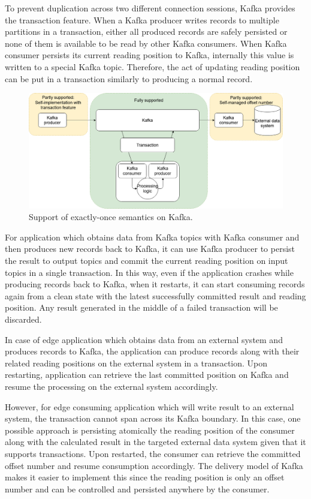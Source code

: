 To prevent duplication across two different connection sessions, Kafka provides the transaction feature. When a Kafka producer writes records to multiple partitions in a transaction, either all produced records are safely persisted or none of them is available to be read by other Kafka consumers. When Kafka consumer persists its current reading position to Kafka, internally this value is written to a special Kafka topic. Therefore, the act of updating reading position can be put in a transaction similarly to producing a normal record.

\begin{figure}[h]
	\centering
	\includegraphics[width=\linewidth]{images/exactly-once-kafka.png}
	\caption{Support of exactly-once semantics on Kafka.}
	\label{fig:exactlyoncekafka}
\end{figure}


For application which obtains data from Kafka topics with Kafka consumer and then produces new records back to Kafka, it can use Kafka producer to persist the result to output topics and commit the current reading position on input topics in a single transaction. In this way, even if the application crashes while producing records back to Kafka, when it restarts, it can start consuming records again from a clean state with the latest successfully committed result and reading position. Any result generated in the middle of a failed transaction will be discarded. 

In case of edge application which obtains data from an external system and produces records to Kafka, the application can produce records along with their related reading positions on the external system in a transaction. Upon restarting, application can retrieve the last committed position on Kafka and resume the processing on the external system accordingly. 

However, for edge consuming application which will write result to an external system, the transaction cannot span across its Kafka boundary. In this case, one possible approach is persisting atomically the reading position of the consumer along with the calculated result in the targeted external data system given that it supports transactions. Upon restarted, the consumer can retrieve the committed offset number and resume consumption accordingly. The delivery model of Kafka makes it easier to implement this since the reading position is only an offset number and can be controlled and persisted anywhere by the consumer.


